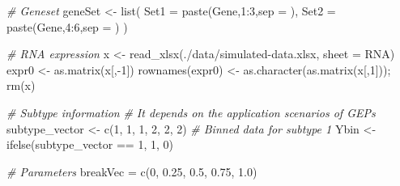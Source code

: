 \documentclass[
  12pt,
]{book}
\newenvironment{Shaded}{\begin{snugshade}}{\end{snugshade}}
\newcommand{\AttributeTok}[1]{\textcolor[rgb]{0.77,0.63,0.00}{#1}}
\newcommand{\CommentTok}[1]{\textcolor[rgb]{0.56,0.35,0.01}{\textit{#1}}}
\newcommand{\DecValTok}[1]{\textcolor[rgb]{0.00,0.00,0.81}{#1}}
\newcommand{\FloatTok}[1]{\textcolor[rgb]{0.00,0.00,0.81}{#1}}
\newcommand{\FunctionTok}[1]{\textcolor[rgb]{0.00,0.00,0.00}{#1}}
\newcommand{\NormalTok}[1]{#1}
\newcommand{\OtherTok}[1]{\textcolor[rgb]{0.56,0.35,0.01}{#1}}
\newcommand{\SpecialCharTok}[1]{\textcolor[rgb]{0.00,0.00,0.00}{#1}}
\newcommand{\StringTok}[1]{\textcolor[rgb]{0.31,0.60,0.02}{#1}}
\begin{document}
\begin{Shaded}
\begin{Highlighting}[]
\CommentTok{\# Geneset}
\NormalTok{geneSet }\OtherTok{\textless{}{-}} \FunctionTok{list}\NormalTok{(}
  \AttributeTok{Set1 =} \FunctionTok{paste}\NormalTok{(}\StringTok{\textquotesingle{}Gene\textquotesingle{}}\NormalTok{,}\DecValTok{1}\SpecialCharTok{:}\DecValTok{3}\NormalTok{,}\AttributeTok{sep =} \StringTok{\textquotesingle{}\textquotesingle{}}\NormalTok{),}
  \AttributeTok{Set2 =} \FunctionTok{paste}\NormalTok{(}\StringTok{\textquotesingle{}Gene\textquotesingle{}}\NormalTok{,}\DecValTok{4}\SpecialCharTok{:}\DecValTok{6}\NormalTok{,}\AttributeTok{sep =} \StringTok{\textquotesingle{}\textquotesingle{}}\NormalTok{)}
\NormalTok{)}

\CommentTok{\# RNA expression}
\NormalTok{x }\OtherTok{\textless{}{-}} \FunctionTok{read\_xlsx}\NormalTok{(}\StringTok{\textquotesingle{}./data/simulated{-}data.xlsx\textquotesingle{}}\NormalTok{, }\AttributeTok{sheet =} \StringTok{\textquotesingle{}RNA\textquotesingle{}}\NormalTok{)}
\NormalTok{expr0 }\OtherTok{\textless{}{-}} \FunctionTok{as.matrix}\NormalTok{(x[,}\SpecialCharTok{{-}}\DecValTok{1}\NormalTok{])}
\FunctionTok{rownames}\NormalTok{(expr0) }\OtherTok{\textless{}{-}} \FunctionTok{as.character}\NormalTok{(}\FunctionTok{as.matrix}\NormalTok{(x[,}\DecValTok{1}\NormalTok{])); }\FunctionTok{rm}\NormalTok{(x)}

\CommentTok{\# Subtype information}
\CommentTok{\# It depends on the application scenarios of GEPs}
\NormalTok{subtype\_vector }\OtherTok{\textless{}{-}} \FunctionTok{c}\NormalTok{(}\DecValTok{1}\NormalTok{, }\DecValTok{1}\NormalTok{, }\DecValTok{1}\NormalTok{, }\DecValTok{2}\NormalTok{, }\DecValTok{2}\NormalTok{, }\DecValTok{2}\NormalTok{)}
\CommentTok{\# Binned data for subtype 1}
\NormalTok{Ybin }\OtherTok{\textless{}{-}} \FunctionTok{ifelse}\NormalTok{(subtype\_vector }\SpecialCharTok{==} \DecValTok{1}\NormalTok{, }\DecValTok{1}\NormalTok{, }\DecValTok{0}\NormalTok{)}

\CommentTok{\# Parameters}
\NormalTok{breakVec }\OtherTok{=} \FunctionTok{c}\NormalTok{(}\DecValTok{0}\NormalTok{, }\FloatTok{0.25}\NormalTok{, }\FloatTok{0.5}\NormalTok{, }\FloatTok{0.75}\NormalTok{, }\FloatTok{1.0}\NormalTok{)}


\end{Highlighting}
\end{Shaded}
\end{document}
